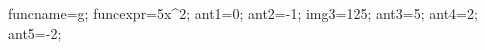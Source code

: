 \documentclass[exercice]{thedocument}%
\begin{document}
%
    \>funcname=g;%
    \>funcexpr=5x^2;%
    \>ant1=0;%
    \>ant2=-1;%
    \>img3=125;%
    \>ant3=5;%
    \>ant4=2;%
    \>ant5=-2;%
\end{document}

